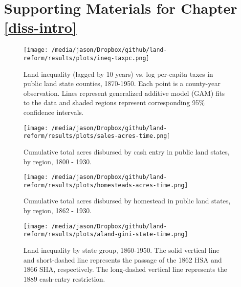 \chapter{Supporting Materials for Chapter \ref{diss-intro}}

\begin{figure}[htbp]
	\begin{center}
		\texttt{[image: /media/jason/Dropbox/github/land-reform/results/plots/ineq-taxpc.png]} 
	\end{center}
	\caption{Land inequality (lagged by 10 years) vs. log per-capita taxes in public land state counties, 1870-1950. Each point is a county-year observation. Lines represent generalized additive model (GAM) fits to the data and shaded regions represent corresponding 95\% confidence intervals.   \label{fig:ineq-taxpc}}
\end{figure} 

\begin{figure}[htbp]
	\begin{center}
		\texttt{[image: /media/jason/Dropbox/github/land-reform/results/plots/sales-acres-time.png]}
	\end{center}
	\caption{Cumulative total acres disbursed by cash entry in public land states, by region, 1800 - 1930. \label{sales-acres-time}} 
\end{figure}

\begin{figure}[htbp]
	\begin{center}
		\texttt{[image: /media/jason/Dropbox/github/land-reform/results/plots/homesteads-acres-time.png]}
	\end{center}
	\caption{Cumulative total acres disbursed by homestead in public land states, by region, 1862 - 1930. \label{homesteads-acres-time}} 
\end{figure}

\begin{figure}[htbp]
	\begin{center}
		\texttt{[image: /media/jason/Dropbox/github/land-reform/results/plots/aland-gini-state-time.png]}
	\end{center}
	\caption{Land inequality by state group, 1860-1950. The solid vertical line and short-dashed line represents the passage of the 1862 HSA and 1866 SHA, respectively. The long-dashed vertical line represents the 1889 cash-entry restriction. \label{aland-gini-state-time}} 
\end{figure}

